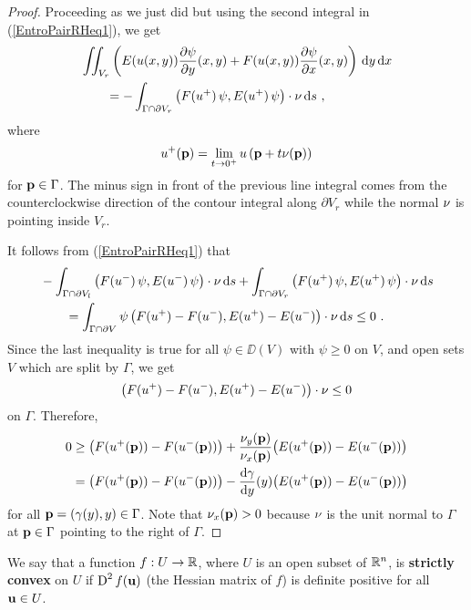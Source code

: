 \begin{proof}
Proceeding as we just did but using the second integral in
(\ref{EntroPairRHeq1}), we get
\begin{equation} \label{EntroPairRHeq3}
\begin{split}
& \iint_{V_r} \left( E(u(x,y)) \frac{\partial{\psi}}{\partial y}(x,y) +
  F(u(x,y)) \frac{\partial{\psi}}{\partial x}(x,y) \right) \,\mathrm{d}{y}\,\mathrm{d}{x} \\
&\qquad =
-\int_{\Gamma\cap\partial V_r}
\left(F(u^+)\,\psi, E(u^+)\,\psi \right)\cdot \mathbf{\nu} \,\mathrm{d}{s} \ ,
\end{split}
\end{equation}
where
\[
u^+(\mathbf{p}) = \lim_{t\rightarrow 0^+}
u\left(\mathbf{p}+t \mathbf{\nu}(\mathbf{p})\right)
\]
for $\mathbf{p} \in \Gamma$.
The minus sign in front of the previous line integral comes from the
counterclockwise direction of the contour integral along $\partial V_r$
while the normal $\mathbf{\nu}$ is pointing inside $V_r$.

It follows from (\ref{EntroPairRHeq1}) that
\begin{align*}
&-\int_{\Gamma \cap \partial V_l}
\left(F(u^-)\,\psi, E(u^-)\,\psi \right)\cdot \mathbf{\nu} \,\mathrm{d}{s} 
+ \int_{\Gamma\cap\partial V_r}
\left(F(u^+)\,\psi, E(u^+)\,\psi \right)\cdot \mathbf{\nu} \,\mathrm{d}{s}  \\
& \qquad = \int_{\Gamma\cap\partial V} \psi
\left( F(u^+)-F(u^-) , E(u^+) - E(u^-) \right)\cdot \mathbf{\nu} \,\mathrm{d}{s}
\leq 0 \ .
\end{align*}
Since the last inequality is true for all
$\psi \in \DD(V)$ with $\psi \geq 0$ on $V$, and open sets $V$ which
are split by $\Gamma$, we get
\[
\left( F(u^+)-F(u^-) , E(u^+) - E(u^-) \right) \cdot \mathbf{\nu} \leq 0
\]
on $\Gamma$.  Therefore,
\begin{align*}
0 &\geq \big(F(u^+(\mathbf{p}))-F(u^-(\mathbf{p}))\big)
 + \frac{\nu_y(\mathbf{p})}{\nu_x(\mathbf{p})}
\big(E(u^+(\mathbf{p}))-E(u^-(\mathbf{p}))\big) \\
&= \big(F(u^+(\mathbf{p}))-F(u^-(\mathbf{p}))\big)
- \frac{\mathrm{d}\gamma}{\mathrm{d}{y}}(y) \big(E(u^+(\mathbf{p}))-E(u^-(\mathbf{p}))\big)
\end{align*}
for all $\mathbf{p}=(\gamma(y),y) \in \Gamma$.
Note that $\nu_x(\mathbf{p})>0$ because $\mathbf{\nu}$ is the unit normal to $\Gamma$
at $\mathbf{p} \in \Gamma$ pointing to the right of $\Gamma$.
\end{proof}

We say that a function $f:U \to \mathbb{R}$, where $U$ is an open subset of
$\mathbb{R}^n$, is {\bfseries strictly convex} on $U$ if
$\operatorname{D}^2 f(\mathbf{u})$ (the Hessian matrix of $f$) is definite
positive for all $\mathbf{u} \in U$.

